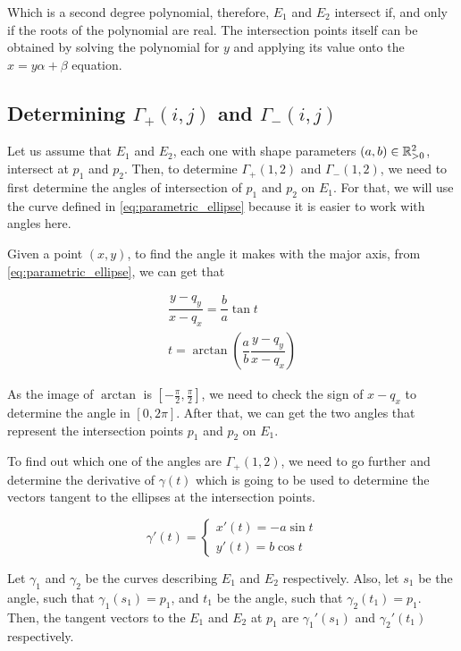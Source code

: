 Which is a second degree polynomial, therefore, $E_1$ and $E_2$ intersect if, and only if the roots of the polynomial are real. The intersection points itself can be obtained by solving the polynomial for $y$ and applying its value onto the $x=y\alpha + \beta$ equation.

\subsection{Determining $\Gamma_+(i,j)$ and $\Gamma_-(i,j)$}

Let us assume that $E_1$ and $E_2$, each one with shape parameters $(a,b) \in \mathbb{R}^2_{>0}$, intersect at $p_1$ and $p_2$. Then, to determine $\Gamma_+(1,2)$ and $\Gamma_-(1,2)$, we need to first determine the angles of intersection of $p_1$ and $p_2$ on $E_1$. For that, we will use the curve defined in \autoref{eq:parametric_ellipse} because it is easier to work with angles here.

Given a point $(x,y)$, to find the angle it makes with the major axis, from \autoref{eq:parametric_ellipse}, we can get that

\begin{align*}
\dfrac{y-q_y}{x-q_x} = \dfrac{b}{a}\tan{t}\\
t=\arctan\left(\dfrac{a}{b} \dfrac{y-q_y}{x-q_x}\right)
\end{align*}

As the image of $\arctan$ is $[-\frac{\pi}{2}, \frac{\pi}{2}]$, we need to check the sign of $x-q_x$ to determine the angle in $[0, 2\pi]$. After that, we can get the two angles that represent the intersection points $p_1$ and $p_2$ on $E_1$.

To find out which one of the angles are $\Gamma_+(1,2)$, we need to go further and determine the derivative of $\gamma(t)$ which is going to be used to determine the vectors tangent to the ellipses at the intersection points.

\begin{equation}\label{eq:der_parametric_ellipse}
\gamma'(t) = \left\{
\begin{array}{l}
x'(t)= -a\sin{t}\\
y'(t)=b\cos{t}
\end{array}
\right.
\end{equation}

Let $\gamma_1$ and $\gamma_2$ be the curves describing $E_1$ and $E_2$ respectively. Also, let $s_1$ be the angle, such that $\gamma_1(s_1)=p_1$, and $t_1$ be the angle, such that $\gamma_2(t_1)=p_1$.
Then, the tangent vectors to the $E_1$ and $E_2$ at $p_1$ are $\gamma_1'(s_1)$ and $\gamma_2'(t_1)$ respectively.

